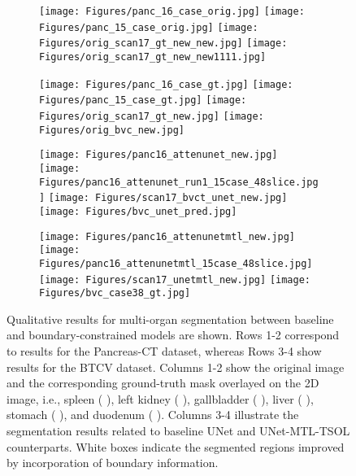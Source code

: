 \documentclass[final,5p,times,twocolumn]{elsarticle}
\begin{document}
\begin{figure*}[!hbt]
\centering
\begin{subfigure}{.23\textwidth}
\centering
\texttt{[image: Figures/panc\_16\_case\_orig.jpg]}
\hfill
\texttt{[image: Figures/panc\_15\_case\_orig.jpg]}
\hfill
\texttt{[image: Figures/orig\_scan17\_gt\_new\_new.jpg]}
\hfill
\texttt{[image: Figures/orig\_scan17\_gt\_new\_new1111.jpg]}
\label{fig:sub30}
\end{subfigure}\begin{subfigure}{.23\textwidth}
\centering
\texttt{[image: Figures/panc\_16\_case\_gt.jpg]}
\hfill
\texttt{[image: Figures/panc\_15\_case\_gt.jpg]}
\hfill
\texttt{[image: Figures/orig\_scan17\_gt\_new.jpg]}
\hfill
\texttt{[image: Figures/orig\_bvc\_new.jpg]}
\label{fig:sub31}
\end{subfigure}
\begin{subfigure}{.23\textwidth}
\centering
\texttt{[image: Figures/panc16\_attenunet\_new.jpg]}
\hfill
\texttt{[image: Figures/panc16\_attenunet\_run1\_15case\_48slice.jpg]}
\hfill
\texttt{[image: Figures/scan17\_bvct\_unet\_new.jpg]}
\hfill
\texttt{[image: Figures/bvc\_unet\_pred.jpg]}
\label{fig:sub32}
\end{subfigure}
\begin{subfigure}{.23\textwidth}
\centering
\texttt{[image: Figures/panc16\_attenunetmtl\_new.jpg]}
\hfill
\texttt{[image: Figures/panc16\_attenunetmtl\_15case\_48slice.jpg]}
\hfill 
\texttt{[image: Figures/scan17\_unetmtl\_new.jpg]}
\hfill
\texttt{[image: Figures/bvc\_case38\_gt.jpg]}
\label{fig:sub33}
\end{subfigure}
\caption{Qualitative results for multi-organ segmentation between baseline and boundary-constrained models are shown. Rows 1-2 correspond to results for the Pancreas-CT dataset, whereas Rows 3-4 show results for the BTCV dataset. Columns 1-2 show the original image and the corresponding ground-truth mask overlayed on the 2D image, i.e., spleen (  ), left kidney (  ), gallbladder (  ), liver (  ), stomach (  ), and duodenum (  ). Columns 3-4 illustrate the segmentation results related to baseline UNet and UNet-MTL-TSOL counterparts. White boxes indicate the segmented regions improved by incorporation of boundary information.}
\label{fig:visual}
\end{figure*}
\end{document}
